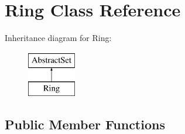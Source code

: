 \hypertarget{classRing}{\section{Ring Class Reference}
\label{classRing}
}
Inheritance diagram for Ring\-:\begin{figure}[H]
\begin{center}
\leavevmode
\includegraphics[height=2.000000cm]{classRing}
\end{center}
\end{figure}
\subsection*{Public Member Functions}
